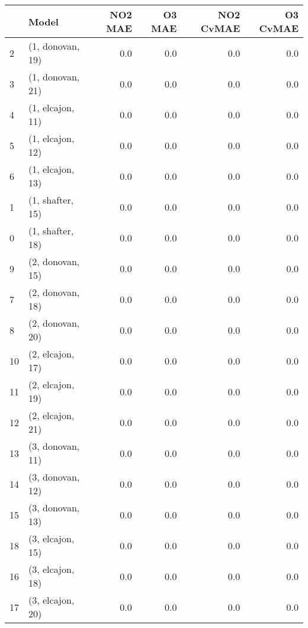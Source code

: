 \begin{tabular}{llrrrr}
\toprule
{} &             Model &  NO2 MAE &  O3 MAE &  NO2 CvMAE &  O3 CvMAE \\
\midrule
2  &  (1, donovan, 19) &      0.0 &     0.0 &        0.0 &       0.0 \\
3  &  (1, donovan, 21) &      0.0 &     0.0 &        0.0 &       0.0 \\
4  &  (1, elcajon, 11) &      0.0 &     0.0 &        0.0 &       0.0 \\
5  &  (1, elcajon, 12) &      0.0 &     0.0 &        0.0 &       0.0 \\
6  &  (1, elcajon, 13) &      0.0 &     0.0 &        0.0 &       0.0 \\
1  &  (1, shafter, 15) &      0.0 &     0.0 &        0.0 &       0.0 \\
0  &  (1, shafter, 18) &      0.0 &     0.0 &        0.0 &       0.0 \\
9  &  (2, donovan, 15) &      0.0 &     0.0 &        0.0 &       0.0 \\
7  &  (2, donovan, 18) &      0.0 &     0.0 &        0.0 &       0.0 \\
8  &  (2, donovan, 20) &      0.0 &     0.0 &        0.0 &       0.0 \\
10 &  (2, elcajon, 17) &      0.0 &     0.0 &        0.0 &       0.0 \\
11 &  (2, elcajon, 19) &      0.0 &     0.0 &        0.0 &       0.0 \\
12 &  (2, elcajon, 21) &      0.0 &     0.0 &        0.0 &       0.0 \\
13 &  (3, donovan, 11) &      0.0 &     0.0 &        0.0 &       0.0 \\
14 &  (3, donovan, 12) &      0.0 &     0.0 &        0.0 &       0.0 \\
15 &  (3, donovan, 13) &      0.0 &     0.0 &        0.0 &       0.0 \\
18 &  (3, elcajon, 15) &      0.0 &     0.0 &        0.0 &       0.0 \\
16 &  (3, elcajon, 18) &      0.0 &     0.0 &        0.0 &       0.0 \\
17 &  (3, elcajon, 20) &      0.0 &     0.0 &        0.0 &       0.0 \\
\bottomrule
\end{tabular}
